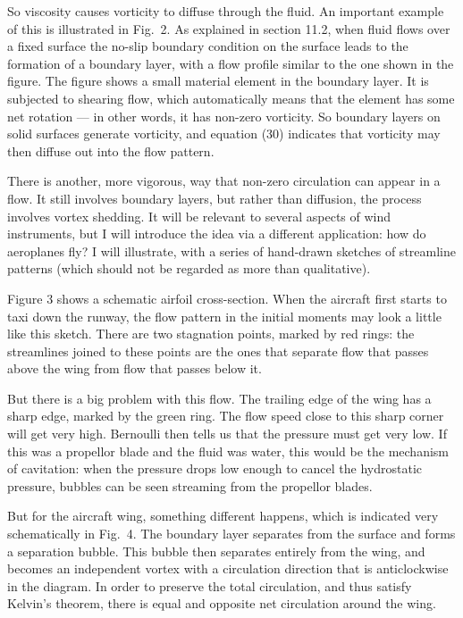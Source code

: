   So viscosity causes vorticity to diffuse through the fluid. An important 
  example of this is illustrated in Fig.\ 2. As explained in section 11.2, when 
  fluid flows over a fixed surface the no-slip boundary condition on the 
  surface leads to the formation of a boundary layer, with a flow profile 
  similar to the one shown in the figure. The figure shows a small material 
  element in the boundary layer. It is subjected to shearing flow, which 
  automatically means that the element has some net rotation --- in other 
  words, it has non-zero vorticity. So boundary layers on solid surfaces 
  generate vorticity, and equation (30) indicates that vorticity may then 
  diffuse out into the flow pattern. 

  There is another, more vigorous, way that non-zero circulation can appear in 
  a flow. It still involves boundary layers, but rather than diffusion, the 
  process involves vortex shedding. It will be relevant to several aspects of 
  wind instruments, but I will introduce the idea via a different application: 
  how do aeroplanes fly? I will illustrate, with a series of hand-drawn 
  sketches of streamline patterns (which should not be regarded as more than 
  qualitative). 

  Figure 3 shows a schematic airfoil cross-section. When the aircraft first 
  starts to taxi down the runway, the flow pattern in the initial moments may 
  look a little like this sketch. There are two stagnation points, marked by 
  red rings: the streamlines joined to these points are the ones that separate 
  flow that passes above the wing from flow that passes below it. 

  But there is a big problem with this flow. The trailing edge of the wing has 
  a sharp edge, marked by the green ring. The flow speed close to this sharp 
  corner will get very high. Bernoulli then tells us that the pressure must get 
  very low. If this was a propellor blade and the fluid was water, this would 
  be the mechanism of cavitation: when the pressure drops low enough to cancel 
  the hydrostatic pressure, bubbles can be seen streaming from the propellor 
  blades. 

  But for the aircraft wing, something different happens, which is indicated 
  very schematically in Fig.\ 4. The boundary layer separates from the surface 
  and forms a separation bubble. This bubble then separates entirely from the 
  wing, and becomes an independent vortex with a circulation direction that is 
  anticlockwise in the diagram. In order to preserve the total circulation, and 
  thus satisfy Kelvin's theorem, there is equal and opposite net circulation 
  around the wing. 

